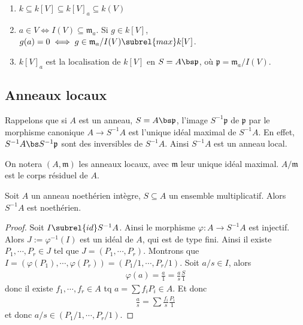         \begin{remq}
            \begin{enumerate}
            \item $k \subseteq k[V] \subseteq k[V]_a \subseteq k(V)$
            \item $a \in V \iff I(V) \subseteq \mathfrak{m}_a$. Si $g \in k[V]$, $g(a) = 0 \iff g \in \mathfrak{m}_a/I(V) \subrel{max} k[V]$.
            \item $k[V]_a$ est la localisation de $k[V]$ en $S = A \bs \mathfrak{p}$, où $\mathfrak{p} = \mathfrak{m}_a/I(V)$. 
            \end{enumerate}
        \end{remq}

        \subsection{Anneaux locaux}
            Rappelons que si $A$ est un anneau, $S = A \bs \mathfrak{p}$, l'image $S^{-1} \mathfrak{p}$ de $\mathfrak{p}$ par le morphisme canonique $A \to S^{-1}A$ est l'unique idéal maximal de $S^{-1}A$. En effet, $S^{-1} A \bs S^{-1}\mathfrak{p}$ sont des inversibles de $S^{-1}A$. Ainsi $S^{-1}A$ est un anneau local. 
            \begin{nota}
                On notera $(A, \mathfrak{m})$ les anneaux locaux, avec $\mathfrak{m}$ leur unique idéal maximal. $A/\mathfrak{m}$ est le corps résiduel de $A$.
            \end{nota}
            \begin{prop}
                Soit $A$ un anneau noethérien intègre, $S \subseteq A$ un ensemble multiplicatif. Alors $S^{-1}A$ est noethérien.
            \end{prop}
            \begin{proof}
                Soit $I \subrel{id} S^{-1}A$. Ainsi le morphisme $\varphi : A \to S^{-1}A$ est injectif. Alors $J := \varphi^{-1}(I)$ est un idéal de $A$, qui est de type fini. Ainsi il existe $P_1, \cdots, P_r \in J$ tel que $J = (P_1, \cdots, P_r)$. Montrons que $I = (\varphi(P_1), \cdots, \varphi(P_r)) = (P_1/1, \cdots, P_r/1)$. Soit $a/s \in I$, alors 
                \begin{align*}
                    \varphi(a) = \frac a1 = \frac as \frac S1
                \end{align*}
                donc il existe $f_1, \cdots, f_r \in A$ tq $a = \sum f_i P_i \in A$. Et donc
                \begin{align*}
                    \frac as = \sum \frac{f_i}s \frac{P_i}1
                \end{align*}
                et donc $a/s \in (P_1/1, \cdots, P_r/1)$.
            \end{proof}
